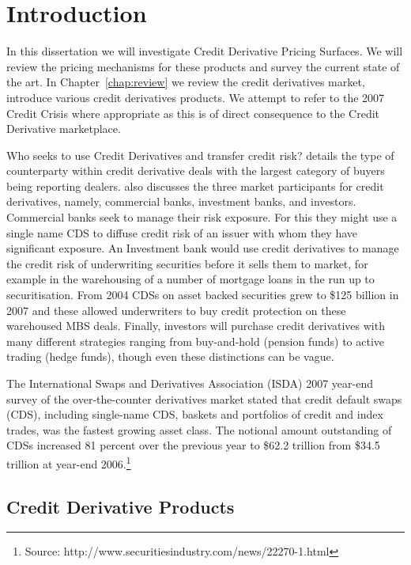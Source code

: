 \chapter{Introduction}\label{chap:intro}


\medskip

In this dissertation we will investigate Credit Derivative Pricing Surfaces. We will
review the pricing mechanisms for these products and survey the current state of the art.   
In Chapter~\ref{chap:review} we review the credit derivatives market, introduce various credit derivatives products.  We attempt to refer to the 2007 Credit Crisis where appropriate as this is of direct consequence to the Credit Derivative marketplace. 

Who seeks to use Credit Derivatives and transfer credit risk? \cite{Gib2007} details the type of counterparty within credit derivative deals with the largest category of buyers being reporting dealers. \cite{Gib2007} also discusses the three market participants for credit derivatives, namely, commercial banks, investment banks, and investors.  Commercial banks seek to manage their risk exposure. For this they might use a single name CDS to diffuse credit risk of an issuer with whom they have significant exposure.   
An Investment bank would use credit derivatives to manage the credit risk of underwriting securities before it sells them to market, for example in the warehousing of a number of mortgage loans in the run up to securitisation. From 2004 CDSs on asset backed securities grew to \$125 billion in 2007 and these allowed underwriters to buy credit protection on these warehoused MBS deals. Finally, investors will purchase credit derivatives with many different strategies ranging from buy-and-hold (pension funds) to active trading (hedge funds), though even these distinctions can be vague.  

The International Swaps and Derivatives Association (ISDA) 2007 year-end survey of the over-the-counter derivatives market stated that credit default swaps (CDS), including single-name CDS, baskets and portfolios of credit and index trades, was the fastest growing asset class. The notional amount outstanding of CDSs increased 81 percent over the previous year to \$62.2 trillion from \$34.5 trillion at year-end 2006.\footnote{Source: http://www.securitiesindustry.com/news/22270-1.html}


\section{Credit Derivative Products}

